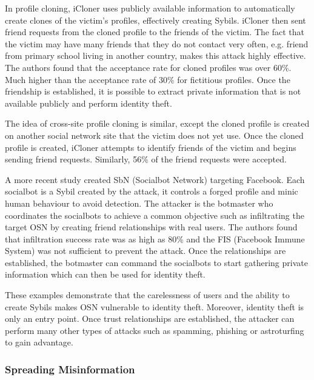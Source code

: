 In profile cloning, iCloner uses publicly available information to automatically
create clones of the victim's profiles, effectively creating Sybils. iCloner
then sent friend requests from the cloned profile to the friends of the victim.
The fact that the victim may have many friends that they do not contact very
often, e.g. friend from primary school living in another country, makes this
attack highly effective. The authors found that the acceptance rate for cloned
profiles was over 60\%. Much higher than the acceptance rate of 30\% for
fictitious profiles. Once the friendship is established, it is possible to
extract private information that is not available publicly and perform identity
theft.

The idea of cross-site profile cloning is similar, except the cloned profile is
created on another social network site that the victim does not yet use. Once
the cloned profile is created, iCloner attempts to identify friends of the
victim and begins sending friend requests. Similarly, 56\% of the friend
requests were accepted. 

A more recent study created SbN (Socialbot Network) targeting
Facebook\cite{boshmaf2011socialbot}. Each socialbot is a Sybil created by the
attack, it controls a forged profile and minic human behaviour to avoid
detection. The attacker is the botmaster who coordinates the socialbots to
achieve a common objective such as infiltrating the target OSN by creating
friend relationships with real users. The authors found that infiltration
success rate was as high as 80\% and the FIS\cite{stein2011facebook} (Facebook
Immune System) was not sufficient to prevent the attack. Once the relationships
are established, the botmaster can command the socialbots to start gathering
private information which can then be used for identity theft.


These examples demonstrate that the carelessness of users and the ability to
create Sybils makes OSN vulnerable to identity theft. Moreover, identity theft
is only an entry point. Once trust relationships are established, the attacker
can perform many other types of attacks such as spamming, phishing or
astroturfing to gain advantage.

\subsubsection{Spreading Misinformation}

